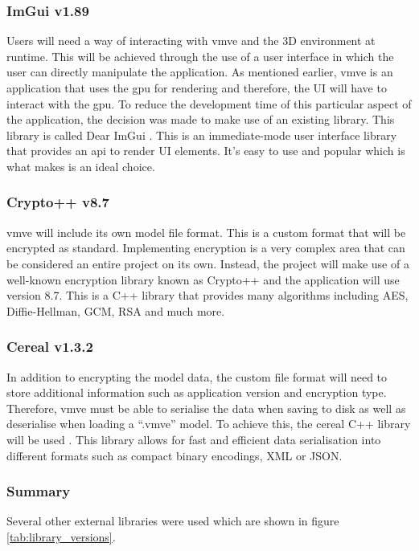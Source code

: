 \documentclass[11pt]{article}
\begin{document}
\subsubsection{ImGui v1.89}
Users will need a way of interacting with \gls*{vmve} and the 3D environment at
runtime. This will be achieved through the use of a user interface in which the
user can directly manipulate the application. As mentioned earlier, \gls*{vmve}
is an application that uses the \gls*{gpu} for rendering and therefore, the UI
will have to interact with the \gls*{gpu}. To reduce the development time of
this particular aspect of the application, the decision was made to make use of
an existing library. This library is called Dear ImGui \cite{imgui}. This is an
immediate-mode user interface library that provides an \gls*{api} to render UI
elements. It's easy to use and popular which is what makes is an ideal choice.

\subsubsection{Crypto++ v8.7} \label{custom_file_format}
\gls*{vmve} will include its own model file format. This is a custom format that
will be encrypted as standard. Implementing encryption is a very complex area
that can be considered an entire project on its own. Instead, the project will
make use of a well-known encryption library known as Crypto++ \cite{cryptopp}
and the application will use version 8.7. This is a C++ library that provides
many algorithms including AES, Diffie-Hellman, GCM, RSA and much more.

\subsubsection{Cereal v1.3.2}
In addition to encrypting the model data, the custom file format will need to
store additional information such as application version and encryption type.
Therefore, \gls*{vmve} must be able to serialise the data when saving to disk as
well as deserialise when loading a ``.vmve'' model. To achieve this, the cereal
C++ library will be used \cite{cereal}. This library allows for fast and
efficient data serialisation into different formats such as compact binary
encodings, XML or JSON.

\subsubsection{Summary}
Several other external libraries were used which are shown in figure
\ref{tab:library_versions}. 
\end{document}
